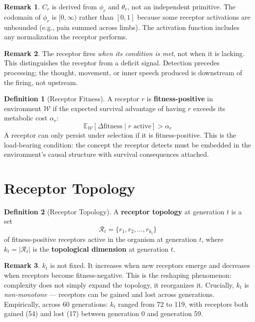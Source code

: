 \documentclass[12pt]{article}
\theoremstyle{definition}
\newtheorem{definition}{Definition}
\newtheorem{remark}{Remark}
\begin{document}
\begin{remark}
$C_r$ is derived from $\phi_r$ and $\theta_r$, not an independent primitive. The codomain
of $\phi_r$ is $[0,\infty)$ rather than $[0,1]$ because some receptor activations are
unbounded (e.g., pain summed across limbs). The activation function includes any
normalization the receptor performs.
\end{remark}

\begin{remark}
The receptor fires \emph{when its condition is met}, not when it is lacking. This
distinguishes the receptor from a deficit signal. Detection precedes processing; the
thought, movement, or inner speech produced is downstream of the firing, not upstream.
\end{remark}

\begin{definition}[Receptor Fitness]
A receptor $r$ is \textbf{fitness-positive} in environment $\mathcal{W}$ if the expected
survival advantage of having $r$ exceeds its metabolic cost $\alpha_r$:
\[
\mathbb{E}_{\mathcal{W}}[\Delta \text{fitness} \mid r \text{ active}] > \alpha_r
\]
A receptor can only persist under selection if it is fitness-positive. This is the
load-bearing condition: the concept the receptor detects must be embedded in the
environment's causal structure with survival consequences attached.
\end{definition}

\section{Receptor Topology}

\begin{definition}[Receptor Topology]
A \textbf{receptor topology} at generation $t$ is a set
\[
\mathcal{R}_t = \{r_1, r_2, \ldots, r_{k_t}\}
\]
of fitness-positive receptors active in the organism at generation $t$, where $k_t = |\mathcal{R}_t|$
is the \textbf{topological dimension} at generation $t$.
\end{definition}

\begin{remark}
$k_t$ is not fixed. It increases when new receptors emerge and decreases when receptors
become fitness-negative. This is the reshaping phenomenon: complexity does not simply
expand the topology, it reorganizes it. Crucially, $k_t$ is \emph{non-monotone} ---
receptors can be gained and lost across generations. Empirically, across 60 generations:
$k_t$ ranged from 72 to 119, with receptors both gained (54) and lost (17) between
generation 0 and generation 59.
\end{remark}
\end{document}
